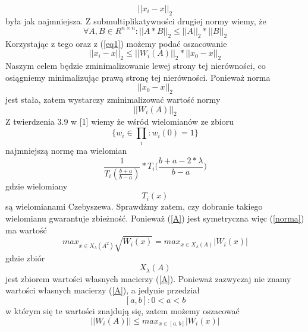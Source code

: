 \documentclass[a4paper]{article}
\begin{document}
\begin{equation}
||x_i-x||_2
\end{equation}
była jak najmniejsza.
Z submultiplikatywności drugiej normy wiemy, że
\begin{equation}
\forall A, B \in R^{n \times n} : ||A*B||_2 \le ||A||_2*||B||_2
\end{equation}
Korzystając z tego oraz z (\ref{eq1}) możemy podać oszacowanie
\begin{equation}
||x_i-x||_2 \le ||W_i(A)||_2 * ||x_0-x||_2
\end{equation}
Naszym celem będzie zminimalizowanie lewej strony tej nierówności, co osiągniemy minimalizując prawą stronę tej nierówności. Ponieważ norma
\begin{equation}
||x_0-x||_2
\end{equation}
jest stała, zatem wystarczy zminimalizować wartość normy
\begin{equation}
\label{norma}
||W_i(A)||_2
\end{equation}
Z twierdzenia 3.9 w [1] wiemy że wśród wielomianów ze zbioru
\begin{equation}
\{w_i \in \prod_i : w_i(0)=1\}
\end{equation}
najmniejszą normę ma wielomian 
\begin{equation}
\label{Cheb}
\frac{1}{T_i(\frac{b+a}{b-a})}*T_i\biggl(\frac{b+a-2*\lambda}{b-a}\biggr)
\end{equation}
gdzie wielomiany
\begin{equation}
T_i(x)
\end{equation}
są wielomianami Czebyszewa.
Sprawdźmy zatem, czy dobranie takiego wielomianu gwarantuje zbieżność.  Ponieważ (\ref{A}) jest symetryczna więc (\ref{norma}) ma wartość
\begin{equation}
max_{x \in X_\lambda(A^2)} \sqrt{W_i(x)}=max_{x \in X_\lambda(A)} |W_i(x)|
\end{equation}
gdzie zbiór
\begin{equation}
X_\lambda(A)
\end{equation}
jest zbiorem wartości własnych macierzy (\ref{A}). Ponieważ zazwyczaj nie znamy wartości własnych macierzy  (\ref{A}), a jedynie przedział
\begin{equation}
\label{interv}
[a, b] : 0 < a < b
\end{equation} 
w którym się te wartości znajdują się, zatem możemy oszacować
\begin{equation}
||W_i(A)|| \le max_{x \in [a, b]} |W_i(x)|
\end{equation}
\end{document}
